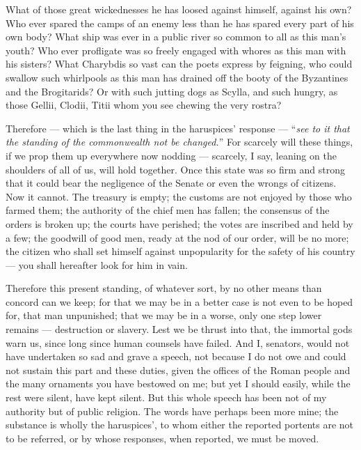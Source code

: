  What of those great wickednesses he has loosed against himself, against his own? Who ever spared the camps of an enemy less than he has spared every part of his own body? What ship was ever in a public river so common to all as this man's youth? Who ever profligate was so freely engaged with whores as this man with his sisters? What Charybdis so vast can the poets express by feigning, who could swallow such whirlpools as this man has drained off the booty of the Byzantines and the Brogitarids? Or with such jutting dogs as Scylla, and such hungry, as those Gellii, Clodii, Titii whom you see chewing the very rostra?

 Therefore --- which is the last thing in the haruspices' response --- ``\textit{see to it that the standing of the commonwealth not be changed.}'' For scarcely will these things, if we prop them up everywhere now nodding --- scarcely, I say, leaning on the shoulders of all of us, will hold together. Once this state was so firm and strong that it could bear the negligence of the Senate or even the wrongs of citizens. Now it cannot. The treasury is empty; the customs are not enjoyed by those who farmed them; the authority of the chief men has fallen; the consensus of the orders is broken up; the courts have perished; the votes are inscribed and held by a few; the goodwill of good men, ready at the nod of our order, will be no more; the citizen who shall set himself against unpopularity for the safety of his country --- you shall hereafter look for him in vain.

 Therefore this present standing, of whatever sort, by no other means than concord can we keep; for that we may be in a better case is not even to be hoped for, that man unpunished; that we may be in a worse, only one step lower remains --- destruction or slavery. Lest we be thrust into that, the immortal gods warn us, since long since human counsels have failed. And I, senators, would not have undertaken so sad and grave a speech, not because I do not owe and could not sustain this part and these duties, given the offices of the Roman people and the many ornaments you have bestowed on me; but yet I should easily, while the rest were silent, have kept silent. But this whole speech has been not of my authority but of public religion. The words have perhaps been more mine; the substance is wholly the haruspices', to whom either the reported portents are not to be referred, or by whose responses, when reported, we must be moved.

